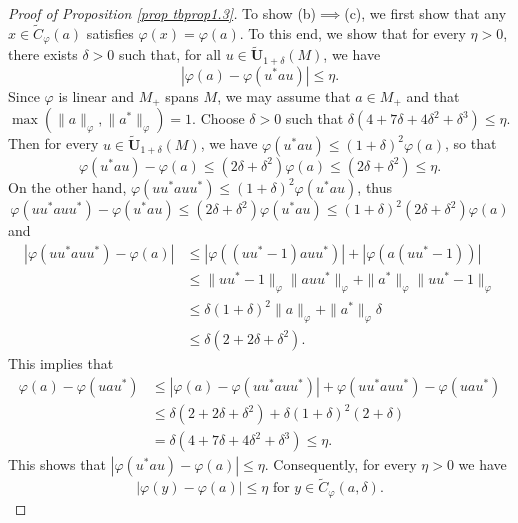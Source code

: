 \documentclass[12pt]{amsart}
\theoremstyle{definition}
\begin{document}
\begin{proof}[Proof of Proposition \ref{prop tbprop1.3}]
To show (b)$\implies$(c), we first show that any $x\in \widetilde{C}_{\varphi}(a)$ satisfies $\varphi(x)=\varphi(a)$.  To this end,
we show that for every $\eta>0$, there exists $\delta>0$ such that, for all $u\in \tilde{\mathbf{U}}_{1+\delta}(M)$, we have
\[|\varphi(a)-\varphi(u^*au)|\le \eta.\]
Since $\varphi$ is linear and $M_+$ spans $M$, we may assume that $a\in M_+$ and that 
$\max(\|a\|_{\varphi},\|a^*\|_{\varphi})=1$.
Choose $\delta>0$ such that $\delta(4+7\delta+4\delta^2+\delta^3)\le \eta$. Then for every $u\in \tilde{\mathbf{U}}_{1+\delta}(M)$, we have 
$\varphi(u^*au)\le (1+\delta)^2\varphi(a)$, so that 
$$\varphi(u^*au)-\varphi(a)\le (2\delta+\delta^2)\varphi(a)\le (2\delta+\delta^2)\le \eta.$$ On the other hand, $\varphi(uu^*auu^*)\le (1+\delta)^2\varphi(u^*au)$, thus $$\varphi(uu^*auu^*)-\varphi(u^*au)\le (2\delta+\delta^2)\varphi(u^*au)\le (1+\delta)^2(2\delta+\delta^2)\varphi(a)$$ and 
\begin{align*}
    |\varphi(uu^*auu^*)-\varphi(a)|&\le |\varphi((uu^*-1)auu^*)|+|\varphi(a(uu^*-1))|\\
    &\le \|uu^*-1\|_{\varphi}\|auu^*\|_{\varphi}+\|a^*\|_{\varphi}\|uu^*-1\|_{\varphi}\\
    &\le \delta(1+\delta)^2\|a\|_{\varphi}+\|a^*\|_{\varphi}\delta\\
    &\le \delta(2+2\delta+\delta^2).
\end{align*}
This implies that 
\begin{align*}
    \varphi(a)-\varphi(uau^*)&\le |\varphi(a)-\varphi(uu^*auu^*)|+\varphi(uu^*auu^*)-\varphi(uau^*)\\
    &\le \delta(2+2\delta+\delta^2)+\delta(1+\delta)^2(2+\delta)\\
    &=\delta(4+7\delta+4\delta^2+\delta^3)\le \eta.
\end{align*}
This shows that $|\varphi(u^*au)-\varphi(a)|\le \eta$. Consequently, for every $\eta>0$ we have  
$$|\varphi(y)-\varphi(a)|\le \eta \text{ for }y\in \widetilde{C}_{\varphi}(a,\delta).$$


\end{proof}
\end{document}

